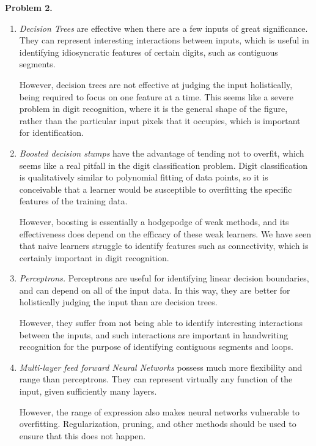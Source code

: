 \documentclass[12pt]{amsart}
\theoremstyle{remark}
\begin{document}
\noindent \textbf{Problem 2.} 
\begin{enumerate}
\item \emph{Decision Trees} are effective when there are a few inputs of great significance. They can represent interesting interactions between inputs, which is useful in identifying idiosyncratic features of certain digits, such as contiguous segments.

However, decision trees are not effective at judging the input holistically, being required to focus on one feature at a time. This seems like a severe problem in digit recognition, where it is the general shape of the figure, rather than the particular input pixels that it occupies, which is important for identification. 

\item \emph{Boosted decision stumps} have the advantage of tending not to overfit, which seems like a real pitfall in the digit classification problem. Digit classification is qualitatively similar to polynomial fitting of data points, so it is conceivable that a learner would be susceptible to overfitting the specific features of the training data. 

However, boosting is essentially a hodgepodge of weak methods, and its effectiveness does depend on the efficacy of these weak learners. We have seen that naive learners struggle to identify features such as connectivity, which is certainly important in digit recognition. 

\item \emph{Perceptrons.} Perceptrons are useful for identifying linear decision boundaries, and can depend on all of the input data. In this way, they are better for holistically judging the input than are decision trees. 

However, they suffer from not being able to identify interesting interactions between the inputs, and such interactions are important in handwriting recognition for the purpose of identifying contiguous segments and loops. 

\item \emph{Multi-layer feed forward Neural Networks} possess much more flexibility and range than perceptrons. They can represent virtually any function of the input, given sufficiently many layers. 

However, the range of expression also makes neural networks vulnerable to overfitting. Regularization, pruning, and other methods should be used to ensure that this does not happen. 
\end{enumerate}
\end{document}
